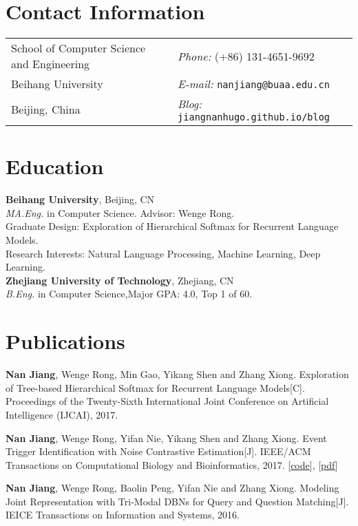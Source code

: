 \documentclass[margin,line]{resume}
\begin{document}

\begin{resume}
\section{Contact Information}
\begin{tabular}{@{}p{3in}p{3in}}
School of Computer Science and Engineering & {\it Phone:}  (+86) 131-4651-9692 \\
Beihang University                         & {\it E-mail:}  {\tt nanjiang@buaa.edu.cn} \\
Beijing, China                             & {\it Blog:} {\tt jiangnanhugo.github.io/blog} \\
\end{tabular}


\section{Education}
{\bf Beihang University}, Beijing,  CN\\
\emph{MA.Eng.} in Computer Science. Advisor: Wenge Rong.\\
Graduate Design: Exploration of Hierarchical Softmax for Recurrent Language Models. \\
Research Interests: Natural Language Processing, Machine Learning, Deep Learning. \\

{\bf Zhejiang University of Technology}, Zhejiang, CN\\
\emph{B.Eng.} in Computer Science,\space Major GPA: 4.0, Top 1 of 60.


\section{Publications}
\textbf{Nan Jiang}, Wenge Rong, Min Gao, Yikang Shen and Zhang Xiong. Exploration of Tree-based Hierarchical Softmax for Recurrent Language Models[C]. Proceedings of the Twenty-Sixth International Joint Conference on Artificial Intelligence (IJCAI), 2017.

\textbf{Nan Jiang}, Wenge Rong, Yifan Nie, Yikang Shen and Zhang Xiong. Event Trigger Identification with Noise Contrastive Estimation[J]. IEEE/ACM Transactions on Computational Biology and Bioinformatics, 2017. [\href{https://github.com/jiangnanHugo/mlee-nce}{code}], [\href{https://github.com/jiangnanhugo/paper/blob/master/APBC2017/APBC2017.pdf}{pdf}]

\textbf{Nan Jiang}, Wenge Rong, Baolin Peng, Yifan Nie and Zhang Xiong. Modeling Joint Representation with Tri-Modal DBNs for Query and Question Matching[J]. IEICE Transactions on Information and Systems, 2016.


\end{resume}
\end{document}
